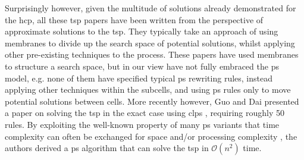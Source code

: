 Surprisingly however, given the multitude of solutions already demonstrated for the \gls{hcp}, all these \gls{tsp} papers have been written from the perspective of approximate solutions to the \gls{tsp}.  They typically take an approach of using membranes to divide up the search space of potential solutions, whilst applying other pre-existing techniques to the process.  These papers have used membranes to structure a search space, but in our view have not fully embraced the \gls{ps} model, e.g. none of them have specified typical \gls{ps} rewriting rules, instead applying other techniques within the subcells, and using \gls{ps} rules only to move potential solutions between cells.  More recently however, Guo and Dai presented a paper on solving the \gls{tsp} in the exact case using \gls{clps} \cite{Guo2017}, requiring roughly 50 rules.  By exploiting the well-known property of many \gls{ps} variants that time complexity can often be exchanged for space and/or processing complexity \cite{Paun1999,Paun2002a,Jimenez2003,Song2017}, the authors derived a \gls{ps} algorithm that can solve the \gls{tsp} in \(\mathcal{O}(n^2)\) time.


